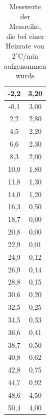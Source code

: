 \begin{table}
\begin{minipage}{0.45\textwidth}
\begin{tabular}{c|c}
-2,2	&3,20\\\hline
-0,1	&3,00\\\hline
2,2		&2,80\\\hline
4,5		&2,20\\\hline
6,6		&2,30\\\hline
8,3		&2,00\\\hline
10,0	&1,80\\\hline
11,8	&1,30\\\hline
14,0	&1,20\\\hline
16,3	&0,50\\\hline
18,7	&0,00\\\hline
20,8	&0,00\\\hline
22,9	&0,01\\\hline
24,9	&0,12\\\hline
26,9	&0,14\\\hline
28,8	&0,15\\\hline
30,6	&0,20\\\hline
32,5	&0,25\\\hline
34,5	&0,33\\\hline
36,6	&0,41\\\hline
38,7	&0,50\\\hline
40,8	&0,62\\\hline
42,8	&0,75\\\hline
44,7	&0,92\\\hline
48,6	&4,50\\\hline
50,4	&4,00\\\hline
\end{tabular}
\end{minipage}
\caption{Messwerte der Messreihe, die bei einer Heizrate von $2^\circ$C/min aufgenommen wurde}
\label{tab_werte1}
\end{table}

